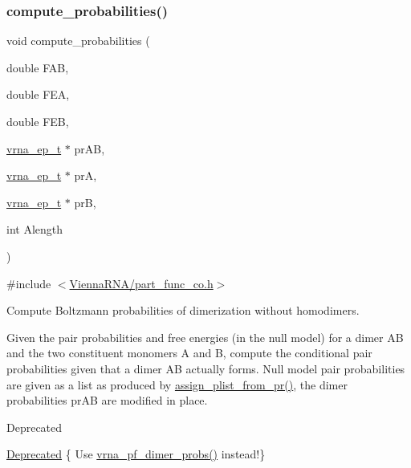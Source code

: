 \subsubsection{\texorpdfstring{compute\_probabilities()}{compute\_probabilities()}}
{\footnotesize\ttfamily void compute\+\_\+probabilities (\begin{DoxyParamCaption}\item[{double}]{F\+AB,  }\item[{double}]{F\+EA,  }\item[{double}]{F\+EB,  }\item[{\mbox{\hyperlink{group__struct__utils__plist_gab9ac98ab55ded9fb90043b024b915aca}{vrna\+\_\+ep\+\_\+t}} $\ast$}]{pr\+AB,  }\item[{\mbox{\hyperlink{group__struct__utils__plist_gab9ac98ab55ded9fb90043b024b915aca}{vrna\+\_\+ep\+\_\+t}} $\ast$}]{prA,  }\item[{\mbox{\hyperlink{group__struct__utils__plist_gab9ac98ab55ded9fb90043b024b915aca}{vrna\+\_\+ep\+\_\+t}} $\ast$}]{prB,  }\item[{int}]{Alength }\end{DoxyParamCaption})}



{\ttfamily \#include $<$\mbox{\hyperlink{part__func__co_8h}{Vienna\+R\+N\+A/part\+\_\+func\+\_\+co.\+h}}$>$}



Compute Boltzmann probabilities of dimerization without homodimers. 

Given the pair probabilities and free energies (in the null model) for a dimer AB and the two constituent monomers A and B, compute the conditional pair probabilities given that a dimer AB actually forms. Null model pair probabilities are given as a list as produced by \mbox{\hyperlink{group__part__func__global__deprecated_ga1cc05aaa9b0e7df2d3887e98321c2030}{assign\+\_\+plist\+\_\+from\+\_\+pr()}}, the dimer probabilities \textquotesingle{}pr\+AB\textquotesingle{} are modified in place.

\begin{DoxyRefDesc}{Deprecated}
\item[\mbox{\hyperlink{deprecated__deprecated000115}{Deprecated}}]\{ Use \mbox{\hyperlink{group__part__func__global_gaa1e39e73afb51fbaf4ae38f0c066c46b}{vrna\+\_\+pf\+\_\+dimer\+\_\+probs()}} instead!\}\end{DoxyRefDesc}



